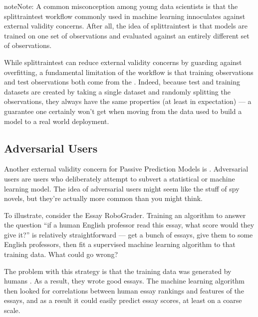 \documentclass[letterpaper,10pt,english]{jupyterBook}
\begin{document}
\begin{sphinxadmonition}{note}{Note:}
\sphinxAtStartPar
A common misconception among young data scientists is that the split\sphinxhyphen{}train\sphinxhyphen{}test workflow commonly used in machine learning innoculates against external validity concerns. After all, the idea of split\sphinxhyphen{}train\sphinxhyphen{}test is that models are trained on one set of observations and evaluated against an entirely different set of observations.

\sphinxAtStartPar
While split\sphinxhyphen{}train\sphinxhyphen{}test can  reduce external validity concerns by guarding against over\sphinxhyphen{}fitting, a fundamental limitation of the workflow is that training observations and test observations both come from the . Indeed, because test and training datasets are created by taking a single dataset and randomly splitting the observations, they  always have the same properties (at least in expectation) — a guarantee one certainly won’t get when moving from the data used to build a model to a real world deployment.
\end{sphinxadmonition}


\subsection{Adversarial Users}
\label{\detokenize{30_questions/24_passive_prediction_external:adversarial-users}}
\sphinxAtStartPar
Another external validity concern for Passive Prediction Models is . Adversarial users are users who deliberately attempt to subvert a statistical or machine learning model. The idea of adversarial users might seem like the stuff of spy novels, but they’re actually  more common than you might think.

\sphinxAtStartPar
To illustrate, consider the Essay RoboGrader. Training an algorithm to answer the question “if a human English professor read this essay, what score would they give it?” is relatively straightforward — get a bunch of essays, give them to some English professors, then fit a supervised machine learning algorithm to that training data. What could go wrong?

\sphinxAtStartPar
The problem with this strategy is that the training data was generated by humans . As a result, they wrote good essays. The machine learning algorithm then looked for correlations between human essay rankings and features of the essays, and as a result it could easily predict essay scores, at least on a coarse scale.
\end{document}
